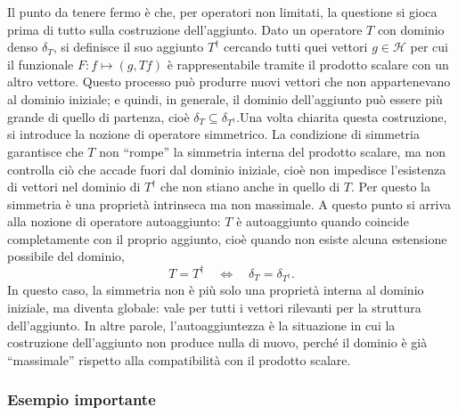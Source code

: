\documentclass[a4paper,12pt]{report}
\begin{document}
Il punto da tenere fermo è che, per operatori non limitati, la questione si gioca prima di tutto sulla costruzione dell’aggiunto. Dato un operatore $T$ con dominio denso $\delta_T$, si definisce il suo aggiunto $T^\dagger$ cercando tutti quei vettori $g \in \mathscr{H}$ per cui il funzionale $F: f \mapsto (g,Tf)$ è rappresentabile tramite il prodotto scalare con un altro vettore. Questo processo può produrre nuovi vettori che non appartenevano al dominio iniziale; e quindi, in generale, il dominio dell’aggiunto può essere più grande di quello di partenza, cioè $\delta_T \subseteq \delta_{T^\dagger}$.Una volta chiarita questa costruzione, si introduce la nozione di operatore simmetrico.
La condizione di simmetria garantisce che $T$ non “rompe” la simmetria interna del prodotto scalare, ma non controlla ciò che accade fuori dal dominio iniziale, cioè non impedisce l'esistenza di vettori nel dominio di $T^\dagger$ che non stiano anche in quello di $T$. Per questo la simmetria è una proprietà intrinseca ma non massimale. A questo punto si arriva alla nozione di operatore autoaggiunto: $T$ è autoaggiunto quando coincide completamente con il proprio aggiunto, cioè quando non esiste alcuna estensione possibile del dominio,
\[
T = T^\dagger \quad \Longleftrightarrow \quad \delta_T = \delta_{T^\dagger}.
\]
In questo caso, la simmetria non è più solo una proprietà interna al dominio iniziale, ma diventa globale: vale per tutti i vettori rilevanti per la struttura dell’aggiunto. In altre parole, l’autoaggiuntezza è la situazione in cui la costruzione dell’aggiunto non produce nulla di nuovo, perché il dominio è già “massimale” rispetto alla compatibilità con il prodotto scalare.

\subsubsection{Esempio importante}
\end{document}
